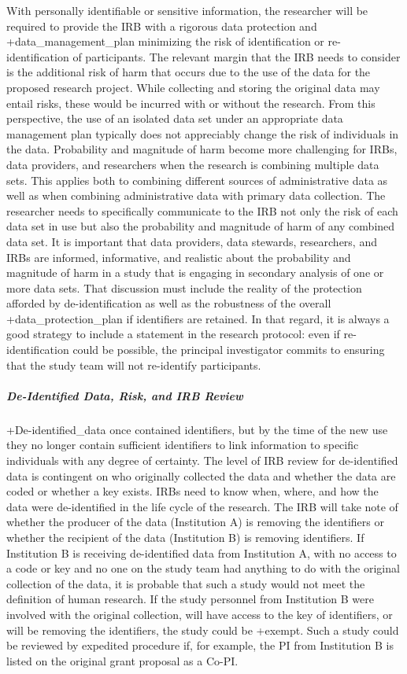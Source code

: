 \documentclass[
]{WileySix}
\begin{document}
With personally identifiable or sensitive information, the researcher will be required to provide the IRB with a rigorous data protection and +data\_management\_plan\textbar{} minimizing the risk of identification or re-identification of participants. The relevant margin that the IRB needs to consider is the additional risk of harm that occurs due to the use of the data for the proposed research project. While collecting and storing the original data may entail risks, these would be incurred with or without the research. From this perspective, the use of an isolated data set under an appropriate data management plan typically does not appreciably change the risk of individuals in the data. Probability and magnitude of harm become more challenging for IRBs, data providers, and researchers when the research is combining multiple data sets. This applies both to combining different sources of administrative data as well as when combining administrative data with primary data collection. The researcher needs to specifically communicate to the IRB not only the risk of each data set in use but also the probability and magnitude of harm of any combined data set. It is important that data providers, data stewards, researchers, and IRBs are informed, informative, and realistic about the probability and magnitude of harm in a study that is engaging in secondary analysis of one or more data sets. That discussion must include the reality of the protection afforded by de-identification as well as the robustness of the overall +data\_protection\_plan\textbar{} if identifiers are retained. In that regard, it is always a good strategy to include a statement in the research protocol: even if re-identification could be possible, the principal investigator commits to ensuring that the study team will not re-identify participants.

\hypertarget{de-identified-data-risk-and-irb-review}{%
\subparagraph{De-Identified Data, Risk, and IRB Review}\label{de-identified-data-risk-and-irb-review}}

+De-identified\_data\textbar{} once contained identifiers, but by the time of the new use they no longer contain sufficient identifiers to link information to specific individuals with any degree of certainty. The level of IRB review for de-identified data is contingent on who originally collected the data and whether the data are coded or whether a key exists. IRBs need to know when, where, and how the data were de-identified in the life cycle of the research. The IRB will take note of whether the producer of the data (Institution A) is removing the identifiers or whether the recipient of the data (Institution B) is removing identifiers. If Institution B is receiving de-identified data from Institution A, with no access to a code or key and no one on the study team had anything to do with the original collection of the data, it is probable that such a study would not meet the definition of human research. If the study personnel from Institution B were involved with the original collection, will have access to the key of identifiers, or will be removing the identifiers, the study could be +exempt\textbar. Such a study could be reviewed by expedited procedure if, for example, the PI from Institution B is listed on the original grant proposal as a Co-PI.
\end{document}
